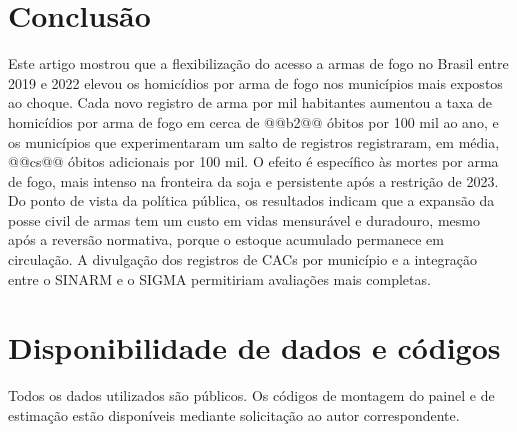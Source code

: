\documentclass[11pt,a4paper]{article}
\begin{document}
\section{Conclusão}\label{sec:conclusao}

Este artigo mostrou que a flexibilização do acesso a armas de fogo no Brasil entre 2019 e 2022 elevou os homicídios por arma de fogo nos municípios mais expostos ao choque. Cada novo registro de arma por mil habitantes aumentou a taxa de homicídios por arma de fogo em cerca de @@b2@@ óbitos por 100 mil ao ano, e os municípios que experimentaram um salto de registros registraram, em média, @@cs@@ óbitos adicionais por 100 mil. O efeito é específico às mortes por arma de fogo, mais intenso na fronteira da soja e persistente após a restrição de 2023. Do ponto de vista da política pública, os resultados indicam que a expansão da posse civil de armas tem um custo em vidas mensurável e duradouro, mesmo após a reversão normativa, porque o estoque acumulado permanece em circulação. A divulgação dos registros de CACs por município e a integração entre o SINARM e o SIGMA permitiriam avaliações mais completas.

\section*{Disponibilidade de dados e códigos}
Todos os dados utilizados são públicos. Os códigos de montagem do painel e de estimação estão disponíveis mediante solicitação ao autor correspondente.



\end{document}

